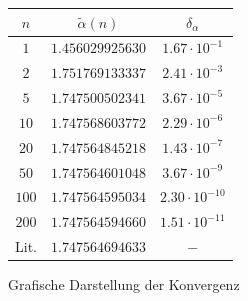 \documentclass[10pt,a4paper]{article}
\begin{document}
\label{sssec:Konvergenz}
\vspace{-10pt}
\begin{figure}[h]
\begin{minipage}[c]{0.5\textwidth}
\captionsetup{type=figure}
\begin{center}

\caption{Grafische Darstellung der Konvergenz}
\label{plotkonvergenz3d}
\end{center}
\end{minipage}
\begin{minipage}[c]{0.5\textwidth}
\captionsetup{type=table}
\begin{center}
\begin{tabular}{c|c|c}
\rule[-1ex]{0pt}{2.5ex} $n$ & $\tilde{\alpha}(n)$ & $\delta_\alpha$ \\ 
\hline 
\rule[-1ex]{0pt}{2.5ex} $1$ & $1.456029925630$ & $1.67\cdot10^{-1}$ \\ 
\hline 
\rule[-1ex]{0pt}{2.5ex} $2$ & $1.751769133337$ & $2.41\cdot10^{-3}$ \\ 
\hline
\rule[-1ex]{0pt}{2.5ex} $5$ & $1.747500502341$ & $3.67\cdot10^{-5}$ \\ 
\hline 
\rule[-1ex]{0pt}{2.5ex} $10$ & $1.747568603772$ & $2.29\cdot10^{-6}$ \\ 
\hline 
\rule[-1ex]{0pt}{2.5ex} $20$ & $1.747564845218$ & $1.43\cdot10^{-7}$ \\ 
\hline 
\rule[-1ex]{0pt}{2.5ex} $50$ & $1.747564601048$ & $3.67\cdot10^{-9}$ \\
\hline
\rule[-1ex]{0pt}{2.5ex} $100$ & $1.747564595034$ & $2.30\cdot10^{-10}$ \\ 
\hline
\rule[-1ex]{0pt}{2.5ex} $200$ & $1.747564594660$ & $1.51\cdot10^{-11}$ \\ 
\hline
\rule[1ex]{0pt}{2.5ex} Lit. & $1.747564694633$ & $ - $
\end{tabular}
\label{tab:konvergenz3d}
\end{center}
\end{minipage}
\end{figure}
\end{document}
